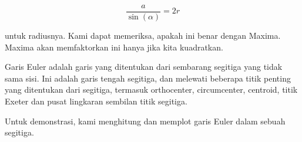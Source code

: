 \documentclass[a4paper,10pt]{article}
\begin{document}
\begin{eulernotebook}
\begin{eulercomment}
\begin{eulercomment}
\begin{eulercomment}
\begin{eulercomment}
\begin{eulercomment}
\begin{eulercomment}
\begin{eulercomment}
\begin{eulercomment}
\begin{eulercomment}
\begin{eulercomment}
\begin{eulercomment}
\begin{eulercomment}
\begin{eulercomment}
\begin{eulercomment}
\begin{eulercomment}
\begin{eulercomment}
\begin{eulercomment}
\end{eulercomment}
\begin{eulerformula}
\[
\frac{a}{\sin(\alpha)}=2r
\]
\end{eulerformula}
\begin{eulercomment}
untuk radiusnya. Kami dapat memeriksa, apakah ini benar dengan Maxima.
Maxima akan memfaktorkan ini hanya jika kita kuadratkan.
\end{eulercomment}
\begin{eulercomment}
Garis Euler adalah garis yang ditentukan dari sembarang segitiga yang
tidak sama sisi. Ini adalah garis tengah segitiga, dan melewati
beberapa titik penting yang ditentukan dari segitiga, termasuk
orthocenter, circumcenter, centroid, titik Exeter dan pusat lingkaran
sembilan titik segitiga.

Untuk demonstrasi, kami menghitung dan memplot garis Euler dalam
sebuah segitiga.


\end{eulercomment}
\end{eulercomment}
\end{eulercomment}
\end{eulercomment}
\end{eulercomment}
\end{eulercomment}
\end{eulercomment}
\end{eulercomment}
\end{eulercomment}
\end{eulercomment}
\end{eulercomment}
\end{eulercomment}
\end{eulercomment}
\end{eulercomment}
\end{eulercomment}
\end{eulercomment}
\end{eulercomment}
\end{eulernotebook}
\end{document}
